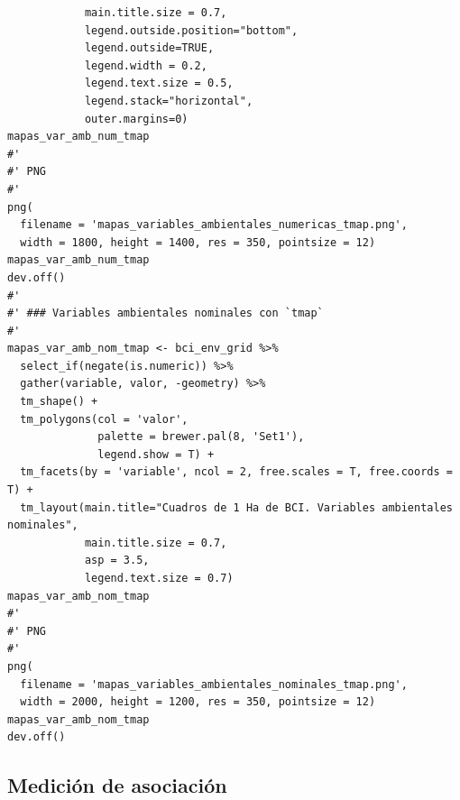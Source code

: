 \documentclass[11pt,]{article}
\begin{document}
\begin{verbatim}
            main.title.size = 0.7,
            legend.outside.position="bottom",
            legend.outside=TRUE,
            legend.width = 0.2,
            legend.text.size = 0.5,
            legend.stack="horizontal", 
            outer.margins=0)
mapas_var_amb_num_tmap
#'
#' PNG
#' 
png(
  filename = 'mapas_variables_ambientales_numericas_tmap.png',
  width = 1800, height = 1400, res = 350, pointsize = 12)
mapas_var_amb_num_tmap
dev.off()
#' 
#' ### Variables ambientales nominales con `tmap`
#' 
mapas_var_amb_nom_tmap <- bci_env_grid %>%
  select_if(negate(is.numeric)) %>% 
  gather(variable, valor, -geometry) %>% 
  tm_shape() +
  tm_polygons(col = 'valor',
              palette = brewer.pal(8, 'Set1'),
              legend.show = T) +
  tm_facets(by = 'variable', ncol = 2, free.scales = T, free.coords = T) +
  tm_layout(main.title="Cuadros de 1 Ha de BCI. Variables ambientales nominales",
            main.title.size = 0.7,
            asp = 3.5,
            legend.text.size = 0.7)
mapas_var_amb_nom_tmap
#'
#' PNG
#' 
png(
  filename = 'mapas_variables_ambientales_nominales_tmap.png',
  width = 2000, height = 1200, res = 350, pointsize = 12)
mapas_var_amb_nom_tmap
dev.off()
\end{verbatim}

\subsection{Medición de asociación}\label{mediciuxf3n-de-asociaciuxf3n}
\end{document}
